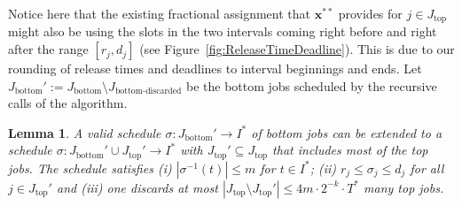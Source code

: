 \documentclass[11pt,letterpaper,oneside,english]{article}
\theoremstyle{theorem}
\newtheorem{lemma}[theorem]{Lemma}
\begin{document}
Notice here that the existing fractional assignment that $\bm{x}^{**}$ provides for $j \in J_{\textrm{top}}$ might 
also be using the slots in the two intervals coming right before and right after  the range $[r_j, d_j]$ (see Figure~\ref{fig:ReleaseTimeDeadline}). This is due to our rounding of release times and deadlines to interval beginnings and ends.
Let $J_{\textrm{bottom}}' := J_{\textrm{bottom}} \setminus J_{\textrm{bottom-discarded}}$ be the bottom jobs 
scheduled by the recursive calls of the algorithm.

\begin{lemma} \label{lem:MakeRoomForJobs} A valid schedule $\sigma : J_{\textrm{bottom}}' \to I^*$ of bottom jobs can be extended to a schedule $\sigma : J_{\textrm{bottom}}' \cup J_{\textrm{top}}' \to I^*$ 
with $J_{\textrm{top}}' \subseteq J_{\textrm{top}}$
that includes most of the top jobs. The schedule satisfies (i) $|\sigma^{-1}(t)| \leq m$ for $t \in I^*$; (ii)  $r_j \leq \sigma_j \leq d_j$ for all $j \in J_{\textrm{top}}'$ and (iii) one discards at most $|J_{\textrm{top}} \setminus J_{\textrm{top}}'| \leq 4m \cdot 2^{-k} \cdot T^*$ many top jobs. \end{lemma}
\end{document}
